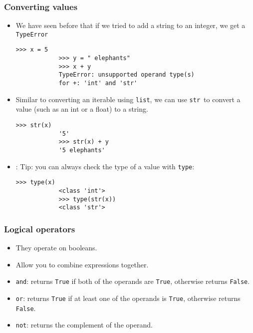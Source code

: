\documentclass[notes]{beamer}
\begin{document}
	\begin{frame}[fragile]
		\frametitle{Converting values}
		\begin{itemize}
			\item We have seen before that if we tried to add a string to an integer, we get a \lstinline|TypeError|
			\begin{lstlisting}[xleftmargin=\dimexpr-\leftmargini, basicstyle=\scriptsize\tt]
			>>> x = 5
			>>> y = " elephants"
			>>> x + y
			TypeError: unsupported operand type(s)
			for +: 'int' and 'str'
			\end{lstlisting}
			\pause
			\item Similar to converting an iterable using \lstinline|list|, we can use \lstinline|str|~to convert a value (such as an int or a float) to a string.
			\begin{lstlisting}[xleftmargin=\dimexpr-\leftmargini, basicstyle=\scriptsize\tt]
			>>> str(x)
			'5'
			>>> str(x) + y
			'5 elephants'
			\end{lstlisting}
			
			\item: Tip: you can always check the type of a value with \lstinline|type|:
			\begin{lstlisting}[xleftmargin=\dimexpr-\leftmargini, basicstyle=\scriptsize\tt]
			>>> type(x)
			<class 'int'>
			>>> type(str(x))
			<class 'str'>
			\end{lstlisting}
		
		\end{itemize}
	\end{frame}
	
	\begin{frame}[fragile]
		\frametitle{Logical operators}
		\begin{itemize}
			\item They operate on booleans.
			\item Allow you to combine expressions together.
			\pause
			\item \lstinline|and|: returns \lstinline|True| if both of the operands are \lstinline|True|, otherwise returns \lstinline|False|.
			\item \lstinline|or|: returns \lstinline|True| if at least one of the operands is \lstinline|True|, otherwise returns \lstinline|False|.
			\item \lstinline|not|: returns the complement of the operand.
		\end{itemize}
	\end{frame}
	
\end{document}

